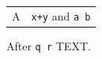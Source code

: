 \documentclass{article}
\begin{document}
\begin{tabularx}{\linewidth}{lX}
A & \verb|x+y| and \verb*|a b| \\
\end{tabularx}
After \verb|q r| TEXT.
\end{document}
